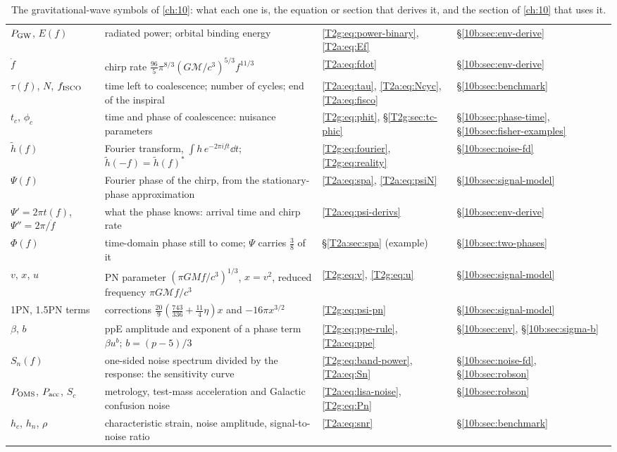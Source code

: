 \begin{table}[htbp]
\begin{tabularx}{\linewidth}{@{}>{\raggedright\arraybackslash}p{2.35cm} >{\raggedright\arraybackslash}X >{\raggedright\arraybackslash}p{2.1cm} >{\raggedright\arraybackslash}p{2.5cm}@{}}
$P_{\rm GW}$, $E(f)$ & radiated power; orbital binding energy & \eqref{T2g:eq:power-binary}, \eqref{T2a:eq:Ef} & \S\ref{10b:sec:env-derive} \\
$\dot f$ & chirp rate $\tfrac{96}{5}\pi^{8/3}(G\mathcal M/c^3)^{5/3}f^{11/3}$ & \eqref{T2a:eq:fdot} & \S\ref{10b:sec:env-derive} \\
$\tau(f)$, $N$, $f_{\rm ISCO}$ & time left to coalescence; number of cycles; end of the inspiral & \eqref{T2a:eq:tau}, \eqref{T2a:eq:Ncyc}, \eqref{T2a:eq:fisco} & \S\ref{10b:sec:benchmark} \\
$t_c$, $\phi_c$ & time and phase of coalescence: nuisance parameters & \eqref{T2g:eq:phit}, \S\ref{T2g:sec:tc-phic} & \S\ref{10b:sec:phase-time}, \S\ref{10b:sec:fisher-examples} \\
$\tilde h(f)$ & Fourier transform, $\int h\,e^{-2\pi ift}\dd t$; $\tilde h(-f)=\tilde h(f)^*$ & \eqref{T2g:eq:fourier}, \eqref{T2g:eq:reality} & \S\ref{10b:sec:noise-fd} \\
$\Psi(f)$ & Fourier phase of the chirp, from the stationary-phase approximation & \eqref{T2a:eq:spa}, \eqref{T2a:eq:psiN} & \S\ref{10b:sec:signal-model} \\
$\Psi'=2\pi t(f)$, $\Psi''=2\pi/\dot f$ & what the phase knows: arrival time and chirp rate & \eqref{T2a:eq:psi-derivs} & \S\ref{10b:sec:env-derive} \\
$\Phi(f)$ & time-domain phase still to come; $\Psi$ carries $\tfrac38$ of it & \S\ref{T2a:sec:spa} (example) & \S\ref{10b:sec:two-phases} \\
$v$, $x$, $u$ & PN parameter $(\pi GMf/c^3)^{1/3}$, $x=v^2$, reduced frequency $\pi G\mathcal Mf/c^3$ & \eqref{T2g:eq:v}, \eqref{T2g:eq:u} & \S\ref{10b:sec:signal-model} \\
1PN, 1.5PN terms & corrections $\tfrac{20}{9}(\tfrac{743}{336}+\tfrac{11}4\eta)x$ and $-16\pi x^{3/2}$ & \eqref{T2g:eq:psi-pn} & \S\ref{10b:sec:signal-model} \\
$\beta$, $b$ & ppE amplitude and exponent of a phase term $\beta u^b$; $b=(p-5)/3$ & \eqref{T2g:eq:ppe-rule}, \eqref{T2a:eq:ppe} & \S\ref{10b:sec:env}, \S\ref{10b:sec:sigma-b} \\
$S_n(f)$ & one-sided noise spectrum divided by the response: the sensitivity curve & \eqref{T2g:eq:band-power}, \eqref{T2a:eq:Sn} & \S\ref{10b:sec:noise-fd}, \S\ref{10b:sec:robson} \\
$P_{\rm OMS}$, $P_{\rm acc}$, $S_c$ & metrology, test-mass acceleration and Galactic confusion noise & \eqref{T2a:eq:lisa-noise}, \eqref{T2g:eq:Pn} & \S\ref{10b:sec:robson} \\
$h_c$, $h_n$, $\rho$ & characteristic strain, noise amplitude, signal-to-noise ratio & \eqref{T2a:eq:snr} & \S\ref{10b:sec:benchmark} \\
\bottomrule
\end{tabularx}
\caption{The gravitational-wave symbols of \cref{ch:10}: what each one is, the equation or section that derives it, and the section of \cref{ch:10} that uses it.}
\label{T2g:tab:symbols}
\end{table}

